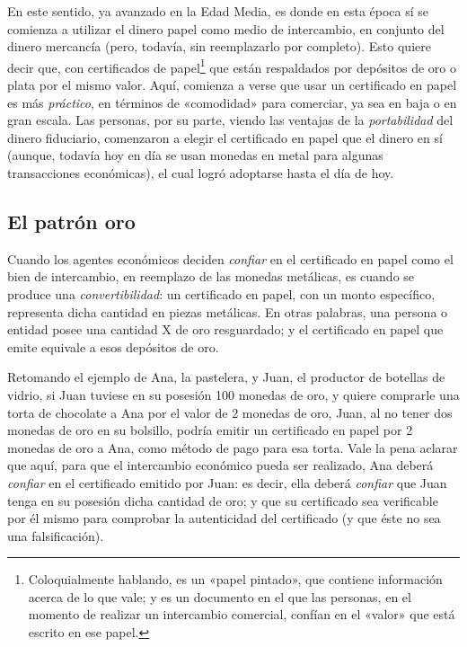 \documentclass[12pt,a4paper,twoside]{book}
\begin{document}
En este sentido, ya avanzado en la Edad Media, es donde en esta época sí se comienza a utilizar el dinero papel como medio de intercambio, en conjunto del dinero mercancía (pero, todavía, sin reemplazarlo por completo). Esto quiere decir que, con certificados de papel\footnote{Coloquialmente hablando, es un «papel pintado», que contiene información acerca de lo que vale; y es un documento en el que las personas, en el momento de realizar un intercambio comercial, confían en el «valor» que está escrito en ese papel.} que están respaldados por depósitos de oro o plata por el mismo valor. Aquí, comienza a verse que usar un certificado en papel es más \textit{práctico}, en términos de «comodidad» para comerciar, ya sea en baja o en gran escala. Las personas, por su parte, viendo las ventajas de la \textit{portabilidad} del dinero fiduciario, comenzaron a elegir el certificado en papel que el dinero en sí (aunque, todavía hoy en día se usan monedas en metal para algunas transacciones económicas), el cual logró adoptarse hasta el día de hoy.

\subsection{El patrón oro}
Cuando los agentes económicos deciden \textit{confiar} en el certificado en papel como el bien de intercambio, en reemplazo de las monedas metálicas, es cuando se produce una \textit{convertibilidad}: un certificado en papel, con un monto específico, representa dicha cantidad en piezas metálicas. En otras palabras, una persona o entidad posee una cantidad X de oro resguardado; y el certificado en papel que emite equivale a esos depósitos de oro.

Retomando el ejemplo de Ana, la pastelera, y Juan, el productor de botellas de vidrio, si Juan tuviese en su posesión 100 monedas de oro, y quiere comprarle una torta de chocolate a Ana por el valor de 2 monedas de oro, Juan, al no tener dos monedas de oro en su bolsillo, podría emitir un certificado en papel por 2 monedas de oro a Ana, como método de pago para esa torta. Vale la pena aclarar que aquí, para que el intercambio económico pueda ser realizado, Ana deberá \textit{confiar} en el certificado emitido por Juan: es decir, ella deberá \textit{confiar} que Juan tenga en su posesión dicha cantidad de oro; y que su certificado sea verificable por él mismo para comprobar la autenticidad del certificado (y que éste no sea una falsificación).
\end{document}
